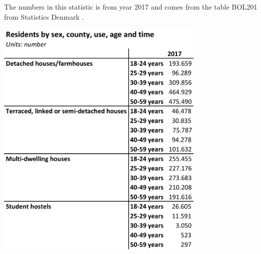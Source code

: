 The numbers in this statistic is from year 2017 and comes from the table BOL201 from Statistics Denmark \cite{DanmarksStatistik}. 

\begin{center}
\includegraphics[width=10cm]{Appendix/Residents.png}
\end{center}

\newpage 